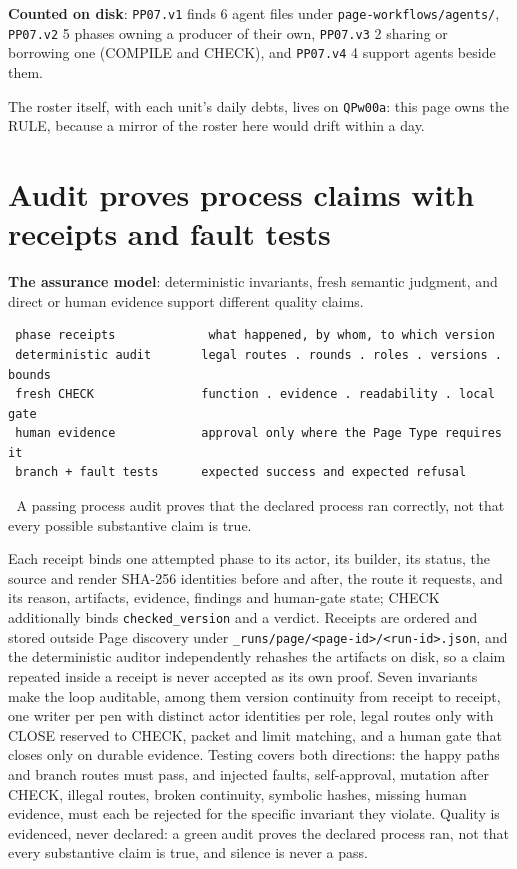 \textbf{Counted on disk}: \texttt{PP07.v1} finds 6 agent files under \texttt{page-workflows/agents/}, \texttt{PP07.v2} 5 phases owning a producer of their own, \texttt{PP07.v3} 2 sharing or borrowing one (COMPILE and CHECK), and \texttt{PP07.v4} 4 support agents beside them.

The roster itself, with each unit's daily debts, lives on \texttt{QPw00a}: this page owns the RULE, because a mirror of the roster here would drift within a day.


\section{Audit proves process claims with receipts and fault tests}
\textbf{The assurance model}: deterministic invariants, fresh semantic judgment, and direct or human evidence support different quality claims.

\begin{verbatim}
 phase receipts             what happened, by whom, to which version
 deterministic audit       legal routes . rounds . roles . versions . bounds
 fresh CHECK               function . evidence . readability . local gate
 human evidence            approval only where the Page Type requires it
 branch + fault tests      expected success and expected refusal
\end{verbatim}
📌 A passing process audit proves that the declared process ran correctly, not that every possible substantive claim is true.

Each receipt binds one attempted phase to its actor, its builder, its status, the source and render SHA-256 identities before and after, the route it requests, and its reason, artifacts, evidence, findings and human-gate state; CHECK additionally binds \texttt{checked\_version} and a verdict. Receipts are ordered and stored outside Page discovery under \texttt{\_runs/page/<page-id>/<run-id>.json}, and the deterministic auditor independently rehashes the artifacts on disk, so a claim repeated inside a receipt is never accepted as its own proof. Seven invariants make the loop auditable, among them version continuity from receipt to receipt, one writer per pen with distinct actor identities per role, legal routes only with CLOSE reserved to CHECK, packet and limit matching, and a human gate that closes only on durable evidence. Testing covers both directions: the happy paths and branch routes must pass, and injected faults, self-approval, mutation after CHECK, illegal routes, broken continuity, symbolic hashes, missing human evidence, must each be rejected for the specific invariant they violate. Quality is evidenced, never declared: a green audit proves the declared process ran, not that every substantive claim is true, and silence is never a pass.

